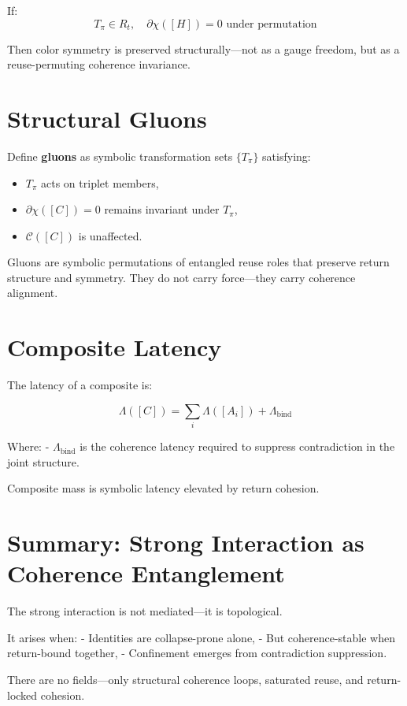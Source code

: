 If:
\[
T_\pi \in R_t,\quad \partial\chi([H]) = 0 \text{ under permutation}
\]

Then color symmetry is preserved structurally—not as a gauge freedom, but as a reuse-permuting coherence invariance.

\section{Structural Gluons} \label{sec:gluons}

Define \textbf{gluons} as symbolic transformation sets $\{T_\pi\}$ satisfying:

\begin{itemize}
  \item $T_\pi$ acts on triplet members,
  \item $\partial\chi([C]) = 0$ remains invariant under $T_\pi$,
  \item $\mathcal{C}([C])$ is unaffected.
\end{itemize}

Gluons are symbolic permutations of entangled reuse roles that preserve return structure and symmetry. They do not carry force—they carry coherence alignment.

\section{Composite Latency} \label{sec:composite-latency}

The latency of a composite is:

\[
\Lambda([C]) = \sum_{i} \Lambda([A_i]) + \Lambda_{\text{bind}}
\]

Where:
- $\Lambda_{\text{bind}}$ is the coherence latency required to suppress contradiction in the joint structure.

Composite mass is symbolic latency elevated by return cohesion.

\section{Summary: Strong Interaction as Coherence Entanglement} \label{sec:strong-summary}

The strong interaction is not mediated—it is topological.

It arises when:
- Identities are collapse-prone alone,
- But coherence-stable when return-bound together,
- Confinement emerges from contradiction suppression.

There are no fields—only structural coherence loops, saturated reuse, and return-locked cohesion.

